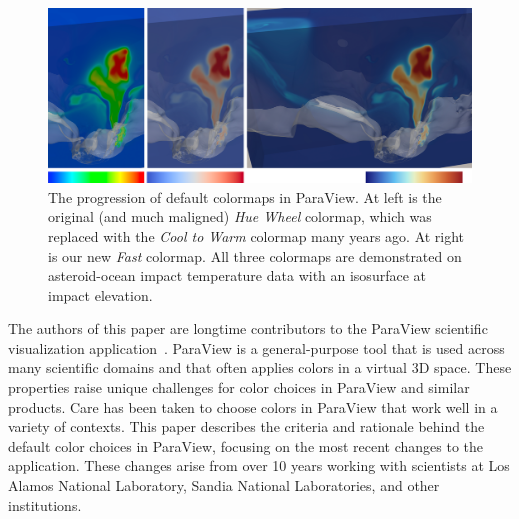 \documentclass{IEEEcsmag}
\newcommand*{\colormap}[1]{\textsl{#1}\xspace}
\newcommand*{\huewheel}{\colormap{Hue Wheel}}
\newcommand*{\coolwarm}{\colormap{Cool to Warm}}
\newcommand*{\fast}{\colormap{Fast}}
\begin{document}
  
\begin{figure}[htb]
\centering
\includegraphics[width=\textwidth]{pics/Ast5.png}
\caption{
  The progression of default colormaps in ParaView.
  At left is the original (and much maligned) \huewheel colormap, which was replaced with the \coolwarm colormap many years ago.
  At right is our new \fast colormap.
  All three colormaps are demonstrated on asteroid-ocean impact temperature data with an isosurface at impact elevation.
}
\label{Ast}
\end{figure}


The authors of this paper are longtime contributors to the ParaView scientific visualization application~\cite{Ahrens2005}.
ParaView is a general-purpose tool that is used across many scientific domains and that often applies colors in a virtual 3D space.
These properties raise unique challenges for color choices in ParaView and similar products.
Care has been taken to choose colors in ParaView that work well in a variety of contexts.
This paper describes the criteria and rationale behind the default color choices in ParaView, focusing on the most recent changes to the application.
These changes arise from over 10 years working with scientists at Los Alamos National Laboratory, Sandia National Laboratories, and other institutions.
\end{document}
